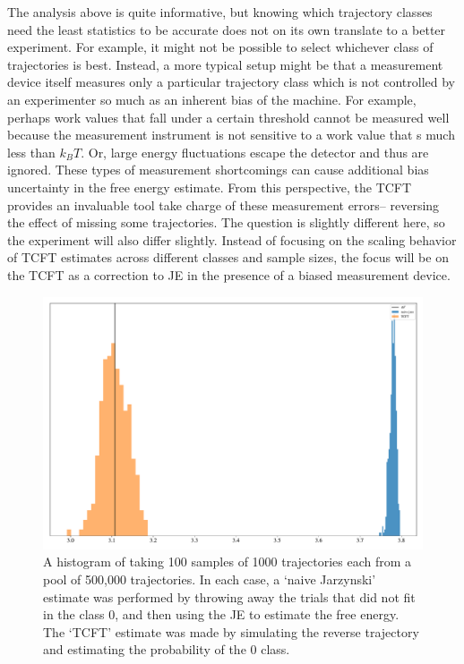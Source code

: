 \documentclass[paper=a4, fontsize=10pt]{article} %
\numberwithin{equation}{section} %
\numberwithin{figure}{section} %
\numberwithin{table}{section} %
\def\kB {k_B}
\begin{document}
The analysis above is quite informative, but knowing which trajectory classes need the least statistics to be accurate does not on its own translate to a better experiment. For example, it might not be possible to select whichever class of trajectories is best. Instead, a more typical setup might be that a measurement device itself measures only a particular trajectory class which is not controlled by an experimenter so much as an inherent bias of the machine. For example, perhaps work values that fall under a certain threshold cannot be measured well because the measurement instrument is not sensitive to a work value that s much less than $\kB T$. Or, large energy fluctuations escape the detector and thus are ignored. These types of measurement shortcomings can cause additional bias uncertainty in the free energy estimate. From this perspective, the TCFT provides an invaluable tool take charge of these measurement errors-- reversing the effect of missing some trajectories. The question is slightly different here, so the experiment will also differ slightly. Instead of focusing on the scaling behavior of TCFT estimates across different classes and sample sizes, the focus will be on the TCFT as a correction to JE in the presence of a biased measurement device.

\begin{figure}
\includegraphics[width=.8\columnwidth, trim=0 0 0 0, clip]{BiasCorrection.pdf}
\centering
\caption{A histogram of taking 100 samples of 1000 trajectories each from a pool of 500,000 trajectories. In each case, a `naive Jarzynski' estimate was performed by throwing away the trials that did not fit in the class $0$, and then using the JE to estimate the free energy. The `TCFT' estimate was made by simulating the reverse trajectory and estimating the probability of the $0$ class.
}
\label{fig:BiasCorrection}
\end{figure}
\end{document}
